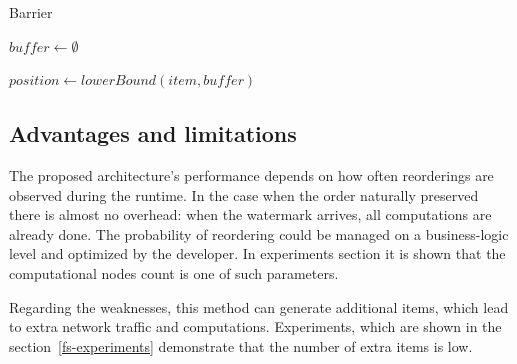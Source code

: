 \begin{algorithm}
\caption{Barrier}
\label{barrier-insert}
  \begin{algorithmic}[1]
    \State $buffer \gets \emptyset$

    \State

      \State $position \gets lowerBound(item, buffer)$
        \State {}
      \Else
        \State {}
      \EndIf
    \EndFunction

    \State

        \State {}
        \State {}
      \EndFor
    \EndFunction
  \end{algorithmic}
\end{algorithm}

\subsection{Advantages and limitations}
The proposed architecture's performance depends on how often reorderings are observed during the runtime. In the case when the order naturally preserved there is almost no overhead: when the watermark arrives, all computations are already done. The probability of reordering could be managed on a business-logic level and optimized by the developer. In experiments section it is shown that the computational nodes count is one of such parameters.

Regarding the weaknesses, this method can generate additional items, which lead to extra network traffic and computations. Experiments, which are shown in the section~\ref{fs-experiments} demonstrate that the number of extra items is low.

